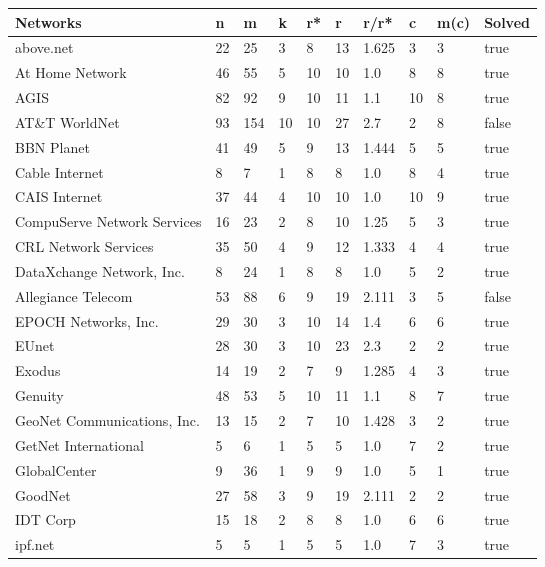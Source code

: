 \documentclass [12pt]{article}
\begin{document}
\thispagestyle{empty}
 \begin {table}[H]
  \begin{tabular}{ | l | l | l | l | l | l | l | l | l | l | }
    \hline
    Networks & n & m & k & r* & r & r/r* & c & m(c) & Solved\\ \hline
    above.net & 22 & 25 & 3 & 8 & 13 & 1.625 & 3 & 3 & true\\ \hline
    At Home Network & 46 & 55 & 5 & 10 & 10 & 1.0 & 8 & 8 & true\\ \hline
    AGIS & 82 & 92 & 9 & 10 & 11 & 1.1 & 10 & 8 & true\\ \hline
    AT\&T WorldNet & 93 & 154 & 10 & 10 & 27 & 2.7 & 2 & 8 & false\\ \hline
    BBN Planet & 41 & 49 & 5 & 9 & 13 & 1.444 & 5 & 5 & true\\ \hline
    Cable Internet & 8 & 7 & 1 & 8 & 8 & 1.0 & 8 & 4 & true\\ \hline
    CAIS Internet & 37 & 44 & 4 & 10 & 10 & 1.0 & 10 & 9 & true\\ \hline
    CompuServe Network Services & 16 & 23 & 2 & 8 & 10 & 1.25 & 5 & 3 & true\\ \hline
    CRL Network Services & 35 & 50 & 4 & 9 & 12 & 1.333 & 4 & 4 & true\\ \hline
    DataXchange Network, Inc. & 8 & 24 & 1 & 8 & 8 & 1.0 & 5 & 2 & true\\ \hline
    Allegiance Telecom & 53 & 88 & 6 & 9 & 19 & 2.111 & 3 & 5 & false\\ \hline
    EPOCH Networks, Inc. & 29 & 30 & 3 & 10 & 14 & 1.4 & 6 & 6 & true\\ \hline
    EUnet & 28 & 30 & 3 & 10 & 23 & 2.3 & 2 & 2 & true\\ \hline
    Exodus & 14 & 19 & 2 & 7 & 9 & 1.285 & 4 & 3 & true\\ \hline
    Genuity & 48 & 53 & 5 & 10 & 11 & 1.1 & 8 & 7 & true\\ \hline
    GeoNet Communications, Inc. & 13 & 15 & 2 & 7 & 10 & 1.428 & 3 & 2 & true\\ \hline
    GetNet International & 5 & 6 & 1 & 5 & 5 & 1.0 & 7 & 2 & true\\ \hline
    GlobalCenter & 9 & 36 & 1 & 9 & 9 & 1.0 & 5 & 1 & true\\ \hline
    GoodNet & 27 & 58 & 3 & 9 & 19 & 2.111 & 2 & 2 & true\\ \hline
    IDT Corp & 15 & 18 & 2 & 8 & 8 & 1.0 & 6 & 6 & true\\ \hline
    ipf.net & 5 & 5 & 1 & 5 & 5 & 1.0 & 7 & 3 & true\\ \hline

\end{tabular}
\end{table}
\end{document}
